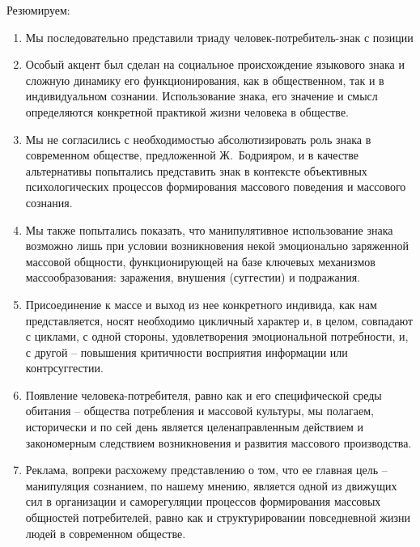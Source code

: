 Резюмируем:
\begin{enumerate}
\item Мы последовательно представили триаду человек-потребитель-знак с позиции
\item Особый акцент был сделан на социальное происхождение языкового знака и
  сложную динамику его функционирования, как в общественном, так и в индивидуальном
  сознании. Использование знака, его значение и смысл определяются конкретной
  практикой жизни человека в обществе.
\item Мы не согласились с необходимостью абсолютизировать роль знака в
  современном обществе, предложенной Ж.~Бодрияром, и в качестве альтернативы
  попытались представить знак в контексте объективных психологических
  процессов формирования массового поведения и массового сознания.
\item Мы также попытались показать, что манипулятивное использование знака
  возможно лишь при условии возникновения некой эмоционально заряженной
  массовой общности, функционирующей на базе ключевых механизмов массообразования:
  заражения, внушения (суггестии) и подражания.
\item Присоединение к массе и выход из нее конкретного индивида,
  как нам представляется, носят необходимо цикличный характер и, в целом,
  совпадают с циклами, с одной стороны, удовлетворения эмоциональной потребности,
  и, с другой -- повышения критичности восприятия информации или контрсуггестии.
\item Появление человека-потребителя, равно как и его специфической среды
  обитания -- общества потребления и массовой культуры, мы полагаем, исторически
  и по сей день является целенаправленным действием и закономерным
  следствием возникновения и развития массового производства.
\item Реклама, вопреки расхожему представлению о том, что ее главная цель --
  манипуляция сознанием, по нашему мнению, является одной из движущих сил
  в организации и саморегуляции процессов формирования массовых общностей
  потребителей, равно как и структурировании повседневной жизни людей в
  современном обществе.
\end{enumerate}

